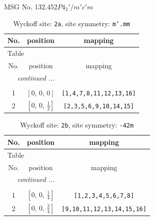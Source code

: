 \documentclass[fleqn,8pt]{jsarticle}
\begin{document}
\setcounter{MaxMatrixCols}{32}

\renewcommand{\tablename}{Table~}
\renewcommand{\figurename}{Figure~}
\begin{center}
\LARGE
MSG No. 132.452\quad$P4_{2}'/m'c'm$
\end{center}
\renewcommand{\arraystretch}{1.2}
\begin{longtable}{ccc}
\caption{Wyckoff site: {\tt 2a}, site symmetry: {\tt m'.mm}}
 \\
 \hline \hline
No. & position & mapping \\ \hline \endfirsthead

\multicolumn{2}{l}{\tablename\ \thetable{}} \\
 \hline \hline
No. & position & mapping \\ \hline \endhead

 \hline \hline
\multicolumn{2}{r}{\footnotesize\it continued ...} \\ \endfoot

 \hline \hline
\multicolumn{2}{r}{} \\ \endlastfoot

1 & $\left[ 0,\, 0,\, 0 \right]$ & {\tt [1,4,7,8,11,12,13,16]} \\ \hline
2 & $\left[ 0,\, 0,\, \frac{1}{2} \right]$ & {\tt [2,3,5,6,9,10,14,15]} \\
\end{longtable}
\renewcommand{\arraystretch}{1.2}
\begin{longtable}{ccc}
\caption{Wyckoff site: {\tt 2b}, site symmetry: {\tt -42m}}
 \\
 \hline \hline
No. & position & mapping \\ \hline \endfirsthead

\multicolumn{2}{l}{\tablename\ \thetable{}} \\
 \hline \hline
No. & position & mapping \\ \hline \endhead

 \hline \hline
\multicolumn{2}{r}{\footnotesize\it continued ...} \\ \endfoot

 \hline \hline
\multicolumn{2}{r}{} \\ \endlastfoot

1 & $\left[ 0,\, 0,\, \frac{1}{4} \right]$ & {\tt [1,2,3,4,5,6,7,8]} \\ \hline
2 & $\left[ 0,\, 0,\, \frac{3}{4} \right]$ & {\tt [9,10,11,12,13,14,15,16]} \\
\end{longtable}
\end{document}
